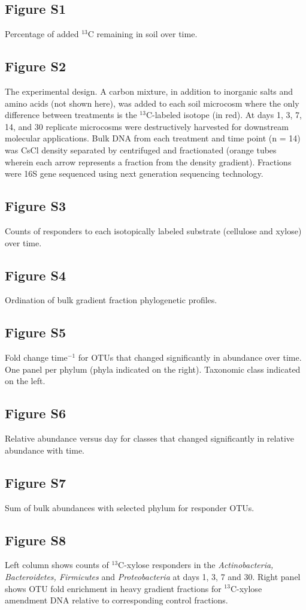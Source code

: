 \subsection{Figure S1}
Percentage of added $^{13}$C remaining in soil over time.     \subsection{Figure S2}
The experimental design.  A carbon mixture, in addition to inorganic salts and amino acids (not shown here), was added to each soil microcosm where the only difference between treatments is the $^{13}$C-labeled isotope (in red). At days 1, 3, 7, 14, and 30 replicate microcosms were destructively harvested for downstream molecular applications. Bulk DNA from each treatment and time point (n = 14) was CsCl density separated by centrifuged and fractionated (orange tubes wherein each arrow represents a fraction from the density gradient). Fractions were 16S gene sequenced using next generation sequencing technology.\subsection{Figure S3}
Counts of responders to each isotopically labeled substrate (cellulose and xylose) over time.\subsection{Figure S4}
Ordination of bulk gradient fraction phylogenetic profiles.\subsection{Figure S5}
Fold change time$^{-1}$ for OTUs that changed significantly in abundance over time. One panel per phylum (phyla indicated on the right). Taxonomic class indicated on the left.\subsection{Figure S6}
Relative abundance versus day for classes that changed significantly in relative abundance with time.\subsection{Figure S7}
Sum of bulk abundances with selected phylum for responder OTUs.
    \subsection{Figure S8}
Left column shows counts of $^{13}$C-xylose responders in the \textit{Actinobacteria, Bacteroidetes, Firmicutes} and \textit{Proteobacteria} at days 1, 3, 7 and 30. Right panel shows OTU fold enrichment in heavy gradient fractions for $^{13}$C-xylose amendment DNA relative to corresponding control fractions. 
